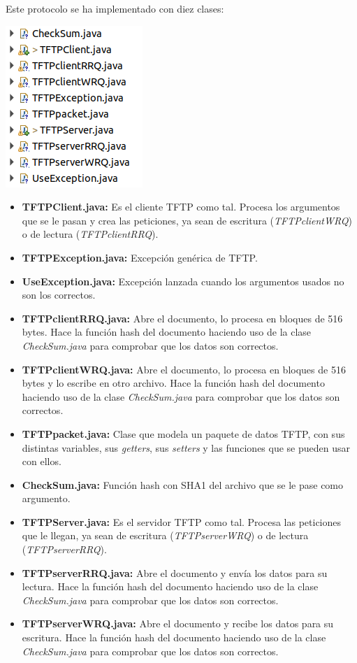 \documentclass{article}
\begin{document}
Este protocolo se ha implementado con diez clases:

\begin{center}
\includegraphics[scale=1]{images/TFTP.png}
\end{center}

\begin{itemize}
\item \textbf{TFTPClient.java:} Es el cliente TFTP como tal. Procesa los argumentos que se le pasan y crea las peticiones, ya sean de escritura (\textit{TFTPclientWRQ}) o de lectura (\textit{TFTPclientRRQ}).
\item \textbf{TFTPException.java:} Excepción genérica de TFTP.
\item \textbf{UseException.java:} Excepción lanzada cuando los argumentos usados no son los correctos.
\item \textbf{TFTPclientRRQ.java:} Abre el documento, lo procesa en bloques de 516 bytes. Hace la función hash del documento haciendo uso de la clase \textit{CheckSum.java} para comprobar que los datos son correctos.
\item \textbf{TFTPclientWRQ.java:} Abre el documento, lo procesa en bloques de 516 bytes y lo escribe en otro archivo. Hace la función hash del documento haciendo uso de la clase \textit{CheckSum.java} para comprobar que los datos son correctos.
\item \textbf{TFTPpacket.java:} Clase que modela un paquete de datos TFTP, con sus distintas variables, sus \textit{getters}, sus \textit{setters} y las funciones que se pueden usar con ellos.
\item \textbf{CheckSum.java:} Función hash con SHA1 del archivo que se le pase como argumento.
\item \textbf{TFTPServer.java:} Es el servidor TFTP como tal. Procesa las peticiones que le llegan, ya sean de escritura (\textit{TFTPserverWRQ}) o de lectura (\textit{TFTPserverRRQ}).
\item \textbf{TFTPserverRRQ.java:} Abre el documento y envía los datos para su lectura. Hace la función hash del documento haciendo uso de la clase \textit{CheckSum.java} para comprobar que los datos son correctos.
\item \textbf{TFTPserverWRQ.java:} Abre el documento y recibe los datos para su escritura. Hace la función hash del documento haciendo uso de la clase \textit{CheckSum.java} para comprobar que los datos son correctos.
\end{itemize}
\end{document}
